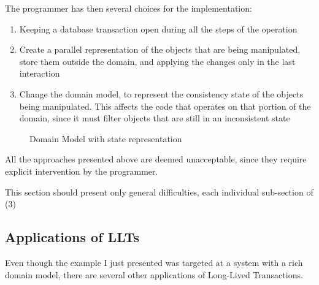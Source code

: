 \documentclass{llncs}
\begin{document}
The programmer has then several choices for the implementation:

\begin{enumerate}
\item Keeping a database transaction open during all the steps of the
  operation

\item Create a parallel representation of the objects that are being
  manipulated, store them outside the domain, and applying the changes
  only in the last interaction

\item Change the domain model, to represent the consistency state of
  the objects being manipulated. This affects the code that operates
  on that portion of the domain, since it must filter objects that are
  still in an inconsistent state
\end{enumerate}

\begin{figure}
\centering
{}

\caption{Domain Model with state representation} 
\label{fig:courseDomainState}

\end{figure}

All the approaches presented above are deemed unacceptable, since they
require explicit intervention by the programmer. 

This section should present only general difficulties, each individual
sub-section of (3)

\subsection{Applications of LLTs}

Even though the example I just presented was targeted at a system with
a rich domain model, there are several other applications of
Long-Lived Transactions.
\end{document}
